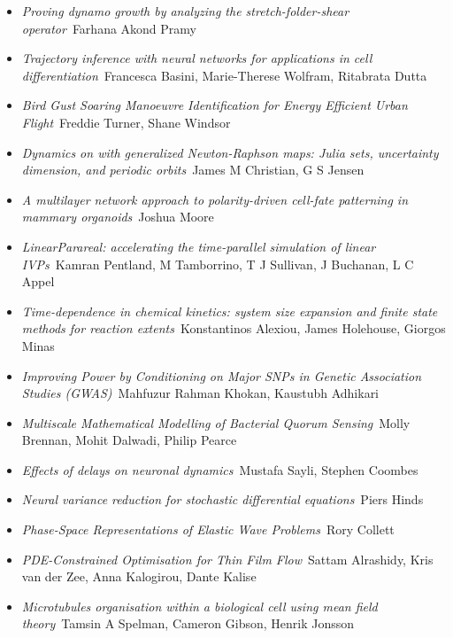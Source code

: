 \begin{itemize}
\item \textit{Proving dynamo growth by analyzing the stretch-folder-shear operator}\
Farhana Akond Pramy

\item \textit{Trajectory inference with neural networks for applications in cell differentiation}\
Francesca Basini, Marie-Therese Wolfram, Ritabrata Dutta

\item \textit{Bird Gust Soaring Manoeuvre Identification for Energy Efficient Urban Flight}\
Freddie Turner, Shane Windsor

\item \textit{Dynamics on \textcent{} with generalized Newton-Raphson maps: Julia sets, uncertainty dimension, and periodic orbits}\
James M Christian, G S Jensen

\item \textit{A multilayer network approach to polarity-driven cell-fate patterning in mammary organoids}\
Joshua Moore

\item \textit{LinearParareal: accelerating the time-parallel simulation of linear IVPs}\
Kamran Pentland, M Tamborrino, T J Sullivan, J Buchanan, L C Appel

\item \textit{Time-dependence in chemical kinetics: system size expansion and finite state methods for reaction extents}\
Konstantinos Alexiou, James Holehouse, Giorgos Minas

\item \textit{Improving Power by Conditioning on Major SNPs in Genetic Association Studies (GWAS)}\
Mahfuzur Rahman Khokan, Kaustubh Adhikari

\item \textit{Multiscale Mathematical Modelling of Bacterial Quorum Sensing}\
Molly Brennan, Mohit Dalwadi, Philip Pearce

\item \textit{Effects of delays on neuronal dynamics}\
Mustafa Sayli, Stephen Coombes

\item \textit{Neural variance reduction for stochastic differential equations}\
Piers Hinds

\item \textit{Phase-Space Representations of Elastic Wave Problems}\
Rory Collett

\item \textit{PDE-Constrained Optimisation for Thin Film Flow}\
Sattam Alrashidy, Kris van der Zee, Anna Kalogirou, Dante Kalise

\item \textit{Microtubules organisation within a biological cell using mean field theory}\
Tamsin A Spelman, Cameron Gibson, Henrik Jonsson

\end{itemize}

